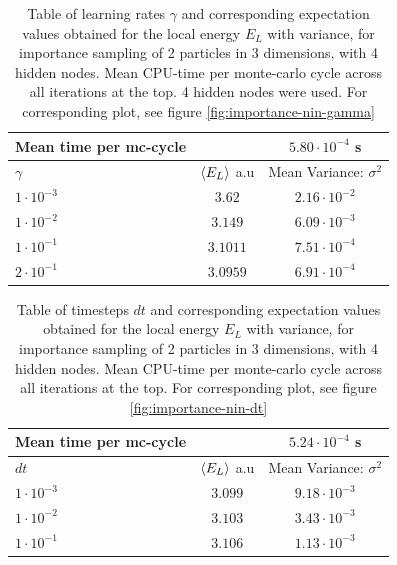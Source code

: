 \begin{table}[h]
\begin{tabular}{l c c}
	Mean time per mc-cycle & &$5.80\cdot10^{-4}$ s \\
	\hline
	$\gamma$ & $\langle E_L \rangle$ a.u & Mean Variance: $\sigma^2$\\
	\hline
	$1\cdot10^{-3}$ & $3.62$ & $2.16\cdot10^{-2}$ \\
	$1\cdot10^{-2}$ & $3.149$ & $6.09\cdot10^{-3}$ \\
	$1\cdot10^{-1}$ & $3.1011$ & $7.51\cdot10^{-4}$ \\
	$2\cdot10^{-1}$ & $3.0959$ & $6.91\cdot10^{-4}$ \\
\end{tabular}
\caption{Table of learning rates $\gamma$ and corresponding expectation values obtained for the local energy $E_L$ with variance, for importance sampling
		of 2 particles in 3 dimensions, with 4 hidden nodes.
		Mean CPU-time per monte-carlo cycle across all iterations at the top. 4 hidden nodes were used.
	For corresponding plot, see figure \ref{fig:importance-nin-gamma}}
\label{tab:importance-nin-gamma}
\end{table}

\begin{table}[h]
\begin{tabular}{l c c}
	Mean time per mc-cycle & & $5.24\cdot10^{-4}$ s \\
	\hline
	$dt$ & $\langle E_L \rangle$ a.u & Mean Variance: $\sigma^2$\\
	\hline
	$1\cdot10^{-3}$ & $3.099$ & $9.18\cdot10^{-3}$ \\
	$1\cdot10^{-2}$ & $3.103$ & $3.43\cdot10^{-3}$ \\
	$1\cdot10^{-1}$ & $3.106$ & $1.13\cdot10^{-3}$ \\
\end{tabular}
\caption{Table of timesteps $dt$ and corresponding expectation values obtained for the local energy $E_L$ with variance, for importance sampling
		of 2 particles in 3 dimensions, with 4 hidden nodes.
		Mean CPU-time per monte-carlo cycle across all iterations at the top.
	For corresponding plot, see figure \ref{fig:importance-nin-dt}}
\label{tab:importance-nin-dt}
\end{table}

